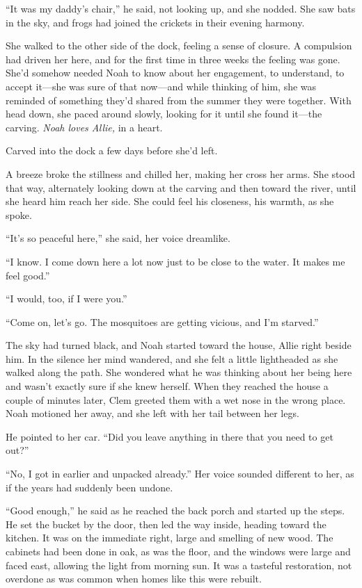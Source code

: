 \documentclass[10pt, twoside, openright]{book}
\begin{document}
``It was my daddy's chair,'' he said, not looking up, and she nodded.
She saw bats in the sky, and frogs had joined the crickets in their
evening harmony.

She walked to the other side of the dock, feeling a sense of closure. A
compulsion had driven her here, and for the first time in three weeks
the feeling was gone. She'd somehow needed Noah to know about her
engagement, to understand, to accept it---she was sure of that now---and
while thinking of him, she was reminded of something they'd shared from
the summer they were together. With head down, she paced around slowly,
looking for it until she found it---the carving. \emph{Noah loves
Allie,} in a heart.

Carved into the dock a few days before she'd left.

A breeze broke the stillness and chilled her, making her cross her arms.
She stood that way, alternately looking down at the carving and then
toward the river, until she heard him reach her side. She could feel his
closeness, his warmth, as she spoke.


``It's so peaceful here,'' she said, her voice dreamlike.


``I know. I come down here a lot now just to be close to the water. It
makes me feel good.''


``I would, too, if I were you.''


``Come on, let's go. The mosquitoes are getting vicious, and I'm
starved.''

The sky had turned black, and Noah started toward the house, Allie right
beside him. In the silence her mind wandered, and she felt a little
lightheaded as she walked along the path. She wondered what he was
thinking about her being here and wasn't exactly sure if she knew
herself. When they reached the house a couple of minutes later, Clem
greeted them with a wet nose in the wrong place. Noah motioned her away,
and she left with her tail between her legs.

He pointed to her car. ``Did you leave anything in there that you need
to get out?''

``No, I got in earlier and unpacked already.'' Her voice sound\-ed
different to her, as if the years had suddenly been undone.

``Good enough,'' he said as he reached the back porch and started up the
steps. He set the bucket by the door, then led the way inside, heading
toward the kitchen. It was on the immediate right, large and smelling of
new wood. The cabinets had been done in oak, as was the floor, and the
windows were large and faced east, allowing the light from morning sun.
It was a tasteful restoration, not overdone as was common when homes
like this were rebuilt.
\end{document}
